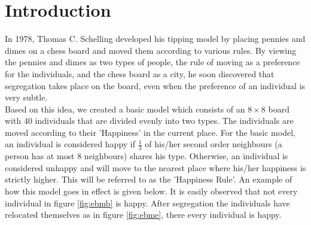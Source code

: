 \section{Introduction}
In 1978, Thomas C. Schelling developed his tipping model by placing pennies and dimes on a chess board and moved them according to various rules. 
By viewing the pennies and dimes as two types of people, the rule of moving as a preference for the individuals, and the chess board as a city, he soon discovered that segregation takes place on the board, even when the preference of an individual is very subtle.\\

Based on this idea, we created a basic model which consists of an $8\times8$ board with $40$ individuals that are divided evenly into two types. 
The individuals are moved according to their 'Happiness' in the current place. 
For the basic model, an individual is considered happy if $\frac{1}{3}$ of his/her second order neighbours (a person has at most $8$ neighbours) shares his type. 
Otherwise, an individual is considered unhappy and will move to the nearest place where  his/her happiness is strictly higher. This will be referred to as the 'Happiness Rule'. 
An example of how this model goes in effect is given below. It is easily observed that not every individual in figure \ref{fig:ebmb} is happy. After segregation the individuals have relocated themselves as in figure \ref{fig:ebme}, there every individual is happy.

